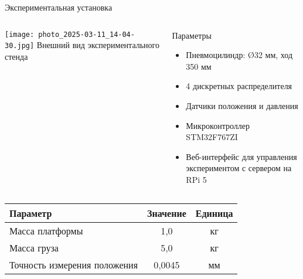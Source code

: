 \begin{frame}{Экспериментальная установка}
	\begin{columns}
		\begin{column}{0.5\textwidth}
			\texttt{[image: photo\_2025-03-11\_14-04-30.jpg]}
			\scriptsize{Внешний вид экспериментального стенда}
		\end{column}
		\begin{column}{0.5\textwidth}
			\begin{block}{\scriptsize Параметры}
				\scriptsize
				\begin{itemize}
					\item Пневмоцилиндр: Ø32 мм, ход 350 мм
					\item 4 дискретных распределителя
					\item Датчики положения и давления
					\item Микроконтроллер STM32F767ZI
					\item Веб-интерфейс для управления экспериментом с сервером на RPi 5
				\end{itemize}
			\end{block}
		\end{column}
	\end{columns}

	\vspace{0.2em}

	\begin{minipage}{\textwidth}
		\centering
		\scriptsize
		\begin{tabular}{|l|c|c|}
			\hline
			\textbf{Параметр}            & \textbf{Значение} & \textbf{Единица} \\
			\hline
			Масса платформы              & 1,0               & кг               \\
			Масса груза                  & 5,0               & кг               \\
			Точность измерения положения & 0,0045            & мм               \\
			\hline
		\end{tabular}
	\end{minipage}
\end{frame}


